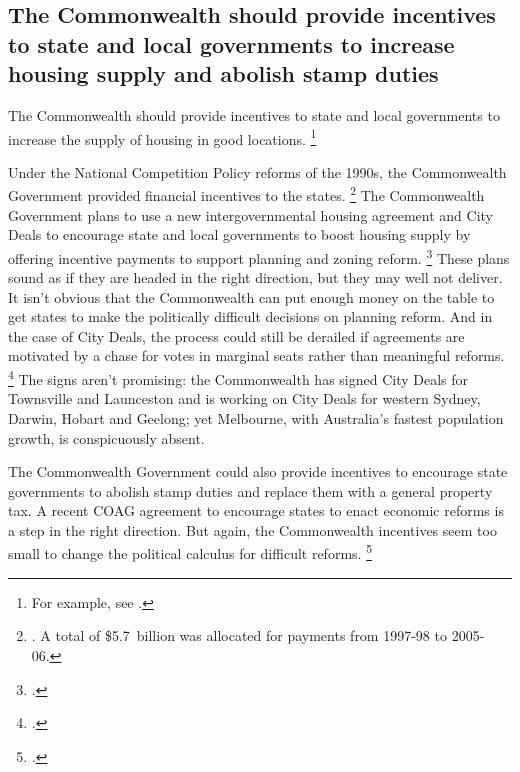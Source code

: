 \subsection{The Commonwealth should provide incentives to state and local governments to increase housing supply and abolish stamp duties}\label{subsec:the-commonwealth-can-provide-incentives-to-state-and-local-governments-to-increase-housing-supply-and-abolish-stamp-duties}

The Commonwealth should provide incentives to state and local governments to increase the supply of housing in good locations.%
    \footnote{For example, see \textcite{Deloitte2016-Fed-Incentives-Housing-Supply}.}

Under the National Competition Policy reforms of the 1990s, the Commonwealth Government provided financial incentives to the states.%
    \footnote{\textcite{PC-2005-Review-Natl-Competition}.
    A total of \$5.7~billion was allocated for payments from 1997-98 to 2005-06.}
The Commonwealth Government plans to use a new intergovernmental housing agreement and City Deals to encourage state and local governments to boost housing supply by offering incentive payments to support planning and zoning reform.%
	\footcites{Budget1718-Housing-pkg-Western-Sydney}{City-Deal-performance-framework}
These plans sound as if they are headed in the right direction, but they may well not deliver.
It isn't obvious that the Commonwealth can put enough money on the table to get states to make the politically difficult decisions on planning reform.
And in the case of City Deals, the process could still be derailed if agreements are motivated by a chase for votes in marginal seats rather than meaningful reforms.%
	\footcite{OBrien-2016-ABC-Townsville-stadium}
The signs aren't promising: the Commonwealth has signed City Deals for Townsville and Launceston and is working on City Deals for western Sydney, Darwin, Hobart and Geelong; yet Melbourne, with Australia's fastest population growth, is conspicuously absent.

The Commonwealth Government could also provide incentives to encourage state governments to abolish stamp duties and replace them with a general property tax.
A recent COAG agreement to encourage states to enact economic reforms is a step in the right direction. But again, the Commonwealth incentives seem too small to change the political calculus for difficult reforms.%
	\footcite{COAG-2016-Competition-productivity-enhancing-reforms}
	
